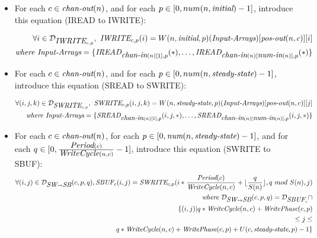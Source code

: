 \begin{itemize}

\item For each $c \in \mbox{\it chan-out}(n)$, and for each $p \in [0,
num(n, \mbox{\it initial})-1]$, introduce this equation (IREAD to IWRITE):

\begin{align*}
\forall i \in {\cal D}_{\mbox{\it IWRITE}_{c, p}},~\mbox{\it IWRITE}_{c,p}(i) = W(n, \mbox{\it initial}, p)(\mbox{\it Input-Arrays})[\mbox{\it pos-out}(n, c)][i] \\
\mbox{\it where Input-Arrays} = \{\mbox{\it IREAD}_{\mbox{\it chan-in}(n)[1], p}(*), \dots, \mbox{\it IREAD}_{\mbox{\it chan-in}(n)[\mbox{\it num-in}(n)], p}(*) \}
\end{align*}

\item For each $c \in \mbox{\it chan-out}(n)$, and for each $p \in [0,
num(n, \mbox{\it steady-state})-1]$, introduce this equation (SREAD to SWRITE):

\begin{align*}
\forall (i, j, k) \in {\cal D}_{\mbox{\it SWRITE}_{c, p}},~\mbox{\it SWRITE}_{c,p}(i,j,k) = W(n, \mbox{\it steady-state}, p)(\mbox{\it Input-Arrays})[\mbox{\it pos-out}(n, c)][j] \\
\mbox{\it where Input-Arrays} = \{\mbox{\it SREAD}_{\mbox{\it chan-in}(n)[1], p}(i, j, *), \dots, \mbox{\it SREAD}_{\mbox{\it chan-in}(n)[\mbox{\it num-in}(n)], p}(i, j, *) \}
\end{align*}

\item For each $c \in \mbox{\it chan-out}(n)$, for each $p \in [0,
\mbox{\it num}(n, \mbox{\it steady-state})-1]$, and for each $q \in
[0,\frac{\mbox{\it Period}(c)}{\mbox{\it WriteCycle}(n,c)}-1]$, introduce this
equation (SWRITE to SBUF):
\begin{align*}
\forall (i,j) \in {\cal D}_{\mbox{\it SW} \rightarrow \mbox{\it SB}}(c,p,q), 
\mbox{\it SBUF}_{c}(i,j) = 
  \mbox{\it SWRITE}_{c, p}(i * \frac{\mbox{\it Period}(c)}{\mbox{\it WriteCycle}(n,c)} + 
                       \lfloor \frac{q}{S(n)} \rfloor, 
                     q~mod~S(n), j) \\
\mbox{\it where } {\cal D}_{\mbox{\it SW} \rightarrow \mbox{\it SB}}(c,p,q) = 
  {\cal D}_{\mbox{\it SBUF}_{c}} \cap \\
  \{ (i,j) | q*\mbox{\it WriteCycle}(n,c) + \mbox{\it WritePhase}(c,p) \\ 
             \le j \le \\ 
             q*\mbox{\it WriteCycle}(n,c) + \mbox{\it WritePhase}(c,p) + 
               U(c, \mbox{\it steady-state}, p) - 1 \} \\
\end{align*}


\end{itemize}
